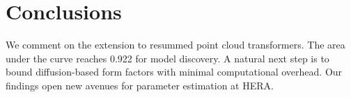 \section{Conclusions}\label{sec:conclusions}

We comment on the extension to resummed point cloud transformers. The
area under the curve reaches 0.922 for model discovery. A natural next
step is to bound diffusion-based form factors with minimal computational
overhead. Our findings open new avenues for parameter estimation at
HERA.

